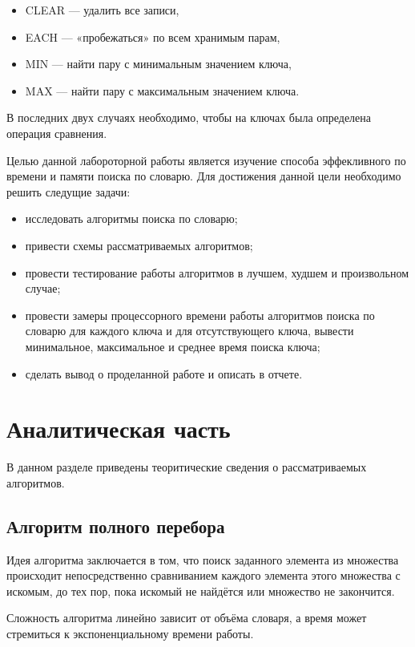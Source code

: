 \documentclass[12pt,a4paper]{report}
\begin{document}
\begin{itemize}
	\item CLEAR — удалить все записи,
	\item EACH — «пробежаться» по всем хранимым парам,
	\item MIN — найти пару с минимальным значением ключа,
	\item MAX — найти пару с максимальным значением ключа.
\end{itemize}

В последних двух случаях необходимо, чтобы на ключах была определена операция сравнения.

Целью данной лабороторной работы является изучение способа эффекливного по времени и памяти поиска по словарю. Для достижения данной цели необходимо решить следущие задачи:

\begin{itemize}
	\item исследовать алгоритмы поиска по словарю;
	\item привести схемы рассматриваемых алгоритмов;
	\item провести тестирование работы алгоритмов в лучшем, худшем и произвольном случае;
	\item провести замеры процессорного времени работы алгоритмов поиска по словарю для каждого ключа и для отсутствующего ключа, вывести минимальное, максимальное и среднее время поиска ключа;
	\item сделать вывод о проделанной работе и описать в отчете.
\end{itemize}

\newpage
\chapter{Аналитическая часть}

В данном разделе приведены теоритические сведения о рассматриваемых алгоритмов.


\section{Алгоритм полного перебора}

Идея алгоритма заключается в том, что поиск заданного элемента из множества происходит непосредственно 
сравниванием каждого элемента этого множества с искомым, до тех пор, пока искомый не найдётся или множество
не закончится. 

Сложность алгоритма линейно зависит от объёма словаря, а время может стремиться к экспоненциальному времени 
работы. 
\end{document}
